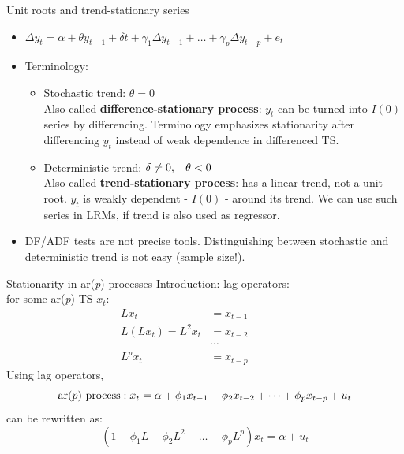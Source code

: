 \documentclass{beamer}
\begin{document}
\begin{frame}{Unit roots and trend-stationary series}
\begin{itemize}
\item $ \Delta y_t = \alpha  + \theta y_{t-1} + \delta t + \gamma_1\Delta y_{t-1}+\dots+\gamma_p\Delta y_{t-p}+e_t$
\vspace{0.2cm}
\item Terminology:
\vspace{0.2cm}
\begin{itemize}
\item Stochastic trend: $\theta=0$ \\
Also called \textbf{difference-stationary process}: $y_t$ can be turned into $I(0)$ series by differencing. Terminology emphasizes stationarity after differencing $y_t$ instead of weak dependence in differenced TS.
\vspace{0.2cm}
\item Deterministic trend: $\delta \neq 0, \hspace{0.3cm} \theta<0$ \\
Also called \textbf{trend-stationary process}: has a linear trend, not a unit root. $y_t$ is weakly dependent - $I(0)$ - around its trend. We can use such series in LRMs, if trend is also used as regressor.
\end{itemize}
\vspace{0.3cm}
\item DF/ADF tests are not precise tools. Distinguishing between stochastic and deterministic trend is not easy (sample size!). 
\end{itemize}
\end{frame}
\begin{frame}{Stationarity in ar(\textit{p}) processes}
Introduction: lag operators:\\ \medskip for some ar(\textit{p}) TS $x_t$:
\begin{align*}
Lx_t &= x_{t-1} \\
L(Lx_t)=L^2x_t &= x_{t-2} ~~~~~~~~~~~~~~~~~\\
&\cdots \\
L^p x_t &= x_{t-p} 
\end{align*}
Using lag operators,
$$ \textnormal{ar}(p) \textnormal{~process}:  x_t = \alpha + \phi_1 x_{t-1} + \phi_2 x_{t-2} +\dots + \phi_p
  x_{t-p}+u_t$$
can be rewritten as: 
$$(1-\phi_1 L - \phi_2 L^2 - \dots - \phi_p L^p)x_t = \alpha + u_t $$
\end{frame}
\end{document}
